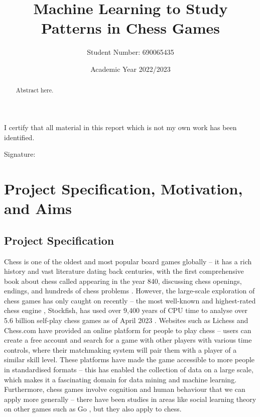 \documentclass[a4paper, 11pt]{article}
\begin{document}
\title{Machine Learning to Study Patterns in Chess Games}
\author{Student Number: 690065435}
\date{Academic Year 2022/2023}

\maketitle

\newpage
\begin{abstract}
{Abstract here}.

\begin{center}
\end{center}
\end{abstract}

\vspace*{\fill}
\begin{center}

\vspace{1em}
I certify that all material in this report which is not my own work has been identified.
\end{center}
\vspace{1em}

Signature: \hrulefill

\newpage
\tableofcontents
\newpage

\section{Project Specification, Motivation, and Aims}

\subsection{Project Specification}
Chess is one of the oldest and most popular board games globally -- it has a rich history and vast literature dating back centuries, with the first comprehensive book about chess called  appearing in the year 840, discussing chess openings, endings, and hundreds of chess problems \cite{earliestChessBooks,wonning2014short}. However, the large-scale exploration of chess games has only caught on recently -- the most well-known and highest-rated chess engine \cite{computerChessRatingLists}, Stockfish, has used over 9,400 years of CPU time to analyse over 5.6 billion self-play chess games as of April 2023 \cite{stockfishTestingFramework}. Websites such as Lichess and Chess.com have provided an online platform for people to play chess -- users can create a free account and search for a game with other players with various time controls, where their matchmaking system will pair them with a player of a similar skill level. These platforms have made the game accessible to more people in standardised formats -- this has enabled the collection of data on a large scale, which makes it a fascinating domain for data mining and machine learning. Furthermore, chess games involve cognition and human behaviour that we can apply more generally -- there have been studies in areas like social learning theory on other games such as Go \cite{beheim2014strategic}, but they also apply to chess.
\end{document}

